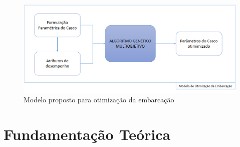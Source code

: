 \documentclass{beamer}
\begin{document}
\begin{frame}
\begin{figure}[h]
	\centering
	\includegraphics[scale=0.37]{img}
	\caption{Modelo proposto para otimização da embarcação}
	\label{fig:modelo}
\end{figure}
\end{frame}
\section{Fundamentação Teórica}
\begin{frame}
\tableofcontents[ 
    currentsubsection, 
    hideothersubsections, 
    sectionstyle=show/shaded
    ] 
\end{frame}
\end{document}
